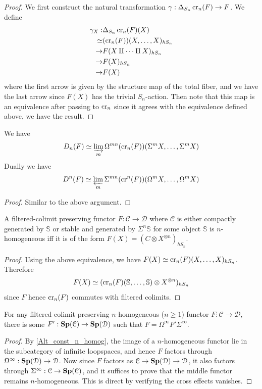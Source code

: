 \begin{proof}
		We first construct the natural transformation $\gamma:\Delta_{S_n}\operatorname{\mathrm{cr}}_n(F)\to F$. We define 
		\begin{align*}
			\gamma_X:&\Delta_{S_n}\operatorname{\mathrm{cr}}_n(F)(X) \\
			\simeq&(\operatorname{\mathrm{cr}}_n(F))(X,\dots,X)_{hS_n} \\
			\to&F(X\amalg\cdots\amalg X)_{hS_n} \\
			\to&F(X)_{hS_n} \\
			\to&F(X)
		\end{align*}
		where the first arrow is given by the structure map of the total fiber, and we have the last arrow since $F(X)$ has the trivial $S_n$-action. Then note that this map is an equivalence after passing to $\operatorname{\mathrm{cr}}_n$ since it agrees with the equivalence defined above, we have the result. 
	\end{proof}
	
	\begin{coro}\label{Alt_const_n_homog}
		We have 
		\[ D_n(F)\simeq\varinjlim_m\Omega^{mn}(\operatorname{\mathrm{cr}}_n(F))(\Sigma^mX,\dots,\Sigma^mX) \] 
		Dually we have 
		\[ D^n(F)\simeq\varprojlim_m\Sigma^{mn}(\operatorname{\mathrm{cr}}^n(F))(\Omega^mX,\dots,\Omega^mX) \]
	\end{coro}
	\begin{proof}
		Similar to the above argument. 
	\end{proof}

	\begin{coro}\label{Fil_colim_n_homog}
		A filtered-colimit preserving functor $F:\mathcal{C}\to\mathcal{D}$ where $\mathcal{C}$ is either compactly generated by $\mathbb{S}$ or stable and generated by $\Sigma^n\mathbb{S}$ for some object $\mathbb{S}$ is $n$-homogeneous iff it is of the form $F(X)=(C\otimes X^{\otimes n})_{hS_n}$. 
	\end{coro}
	\begin{proof}
		Using the above equivalence, we have $F(X)\simeq\operatorname{\mathrm{cr}}_n(F)(X,\dots,X)_{hS_n}$. Therefore 
		\[ F(X)\simeq(\operatorname{\mathrm{cr}}_n(F)(\mathbb{S},\dots,\mathbb{S})\otimes X^{\otimes n})_{hS_n} \]
		since $F$ hence $\operatorname{\mathrm{cr}}_n(F)$ commutes with filtered colimits. 
	\end{proof}

	\begin{lemma}\label{n_homog_fac_stab}
		For any filtered colimit preserving $n$-homogeneous ($n\geq1$) functor $F:\mathcal{C}\to\mathcal{D}$, there is some $F':\mathbf{Sp}(\mathcal{C})\to\mathbf{Sp}(\mathcal{D})$ such that $F=\Omega^\infty F'\Sigma^\infty$. 
	\end{lemma}
	\begin{proof}
		By \cref{Alt_const_n_homog}, the image of a $n$-homogeneous functor lie in the subcategory of infinite loopspaces, and hence $F$ factors through $\Omega^\infty:\mathbf{Sp}(\mathcal{D})\to\mathcal{D}$. Now since $F$ factors as $\mathcal{C}\to\mathbf{Sp}(\mathcal{D})\to\mathcal{D}$, it also factors through $\Sigma^\infty:\mathcal{C}\to\mathbf{Sp}(\mathcal{C})$, and it suffices to prove that the middle functor remains $n$-homogeneous. This is direct by verifying the cross effects vanishes. 
	\end{proof}

